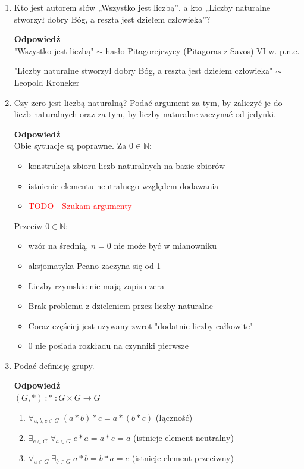 \documentclass[12pt,a4paper]{article}
\theoremstyle{break}
\newcommand{\Odp}[1]{
		\begin{mdframed}[style=zadanie]
			\textbf{Odpowiedź}\\
			#1
		\end{mdframed}
	}
\begin{document}
	\begin{enumerate}[1.]
	\item Kto jest autorem słów „Wszystko jest liczbą”, a kto „Liczby naturalne stworzył dobry Bóg, a reszta jest dziełem człowieka”?
	\Odp{
	"Wszystko jest liczbą" $\sim$ hasło Pitagorejczycy (Pitagoras z Savos) VI w. p.n.e.
	
	"Liczby naturalne stworzył dobry Bóg, a reszta jest dziełem człowieka" $\sim$ Leopold Kroneker
	}
	
	\item Czy zero jest liczbą naturalną? Podać argument za tym, by zaliczyć je do liczb naturalnych oraz za tym, by liczby naturalne zaczynać od jedynki.
	\Odp{
		Obie sytuacje są poprawne. 
		Za $0\in\mathbb{N}$: 
		\begin{itemize}
			\item konstrukcja zbioru liczb naturalnych na bazie zbiorów
			\item istnienie elementu neutralnego względem dodawania
			\item \textcolor{red}{TODO - Szukam argumenty}
		\end{itemize}
		
		Przeciw $0\in\mathbb{N}$:
		\begin{itemize}
			\item wzór na średnią, $n=0$ nie może być w mianowniku
			\item aksjomatyka Peano zaczyna się od 1
			\item Liczby rzymskie nie mają zapisu zera
			\item Brak problemu z dzieleniem przez liczby naturalne
			\item Coraz częściej jest używany zwrot "dodatnie liczby całkowite"
			\item 0 nie posiada rozkładu na czynniki pierwsze
		\end{itemize}
	}
	
	\item Podać definicję grupy.
	\Odp{
	$(G,*) \:: * \:: G \times G \longrightarrow G$
	\begin{enumerate}[1)]
		\item $\forall_{a,b,c \in G} \;(a*b)*c = a*(b*c)$ (łączność)
		\item $\exists_{e\in G} \; \forall_{a\in G} \; e*a=a*e=a$ (istnieje element neutralny)
		\item $\forall_{a\in G} \; \exists_{b\in G} \; a*b=b*a=e$ (istnieje element przeciwny)
	\end{enumerate}
	}
	

\end{enumerate}
\end{document}
